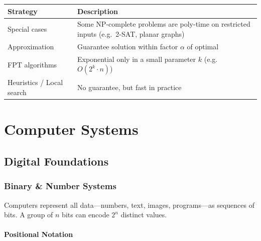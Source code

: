 \documentclass[oneside]{book}
\begin{document}
\begin{center}
\begin{tabularx}{\linewidth}{lX}
\toprule
\textbf{Strategy} & \textbf{Description} \\
\midrule
Special cases        & Some NP-complete problems are poly-time on restricted inputs (e.g.\ 2-SAT, planar graphs) \\
Approximation        & Guarantee solution within factor $\alpha$ of optimal \\
FPT algorithms       & Exponential only in a small parameter $k$ (e.g.\ $O(2^k \cdot n)$) \\
Heuristics / Local search & No guarantee, but fast in practice \\
\bottomrule
\end{tabularx}
\end{center}


\part{Computer Systems}

\chapter{Digital Foundations}

\section{Binary \& Number Systems}


Computers represent all data---numbers, text, images, programs---as sequences of
bits.  A group of $n$ bits can encode $2^n$ distinct values.

\subsection*{Positional Notation}
\end{document}
